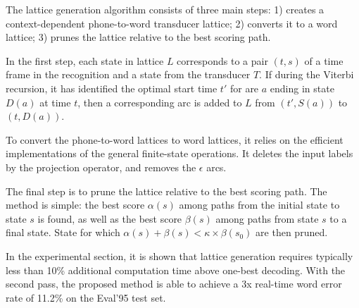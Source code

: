 The lattice generation algorithm consists of three main steps: 1) creates a context-dependent phone-to-word transducer lattice; 2) converts it to a word lattice; 3) prunes the lattice relative to the best scoring path.

In the first step, each state in lattice $L$ corresponds to a pair $(t,s)$ of a time frame in the recognition and a state from the transducer $T$. If during the Viterbi recursion, it has identified the optimal start time $t'$ for are $a$ ending in state $D(a)$ at time $t$, then a corresponding arc is added to $L$ from $(t', S(a))$ to $(t, D(a))$.

To convert the phone-to-word lattices to word lattices, it relies on the efficient implementations of the general finite-state operations. It deletes the input labels by the projection operator, and removes the $\epsilon$ arcs.

The final step is to prune the lattice relative to the best scoring path. The method is simple: the best score $\alpha(s)$ among paths from the initial state to state $s$ is found, as well as the best score $\beta(s)$ among paths from state $s$ to a final state. State for which $\alpha(s) + \beta(s) < \kappa \times \beta(s_0)$ are then pruned.

In the experimental section, it is shown that lattice generation requires typically less than 10\% additional computation time above one-best decoding. With the second pass, the proposed method is able to achieve a 3x real-time word error rate of 11.2\% on the Eval'95 test set. 
